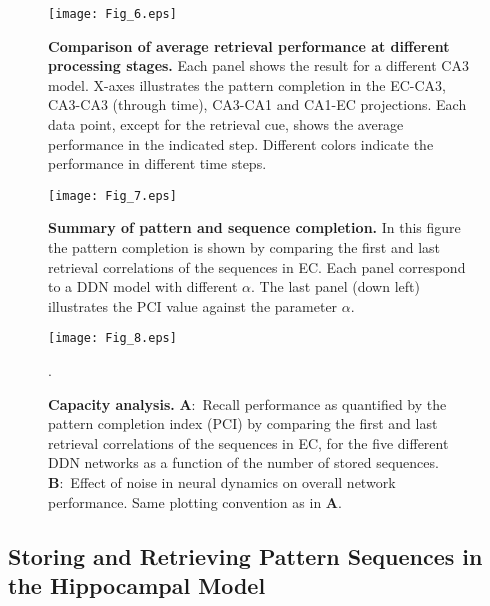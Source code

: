 \documentclass[utf8]{frontiersSCNS} %
\begin{document}
\begin{figure}[!htb]
\centering\texttt{[image: Fig\_6.eps]}
\caption{\textbf{Comparison of average retrieval performance at different processing stages.}
Each panel shows the result for a different CA3 model. X-axes illustrates the pattern completion in the EC-CA3, CA3-CA3 (through time), CA3-CA1 and CA1-EC projections. Each data point, except for the retrieval cue, shows the average performance in the indicated step. Different colors indicate the performance in different time steps.}
\label{Fig_6}
\end{figure}

\begin{figure}[!htb]
\centering\texttt{[image: Fig\_7.eps]}
\caption{\textbf{Summary of pattern and sequence completion.} In this figure the pattern completion is shown by comparing the first and last retrieval correlations of the sequences in EC. Each panel correspond to a  DDN model with different $\alpha$. The last panel (down left) illustrates the PCI value against the parameter $\alpha$.}
\label{Fig_7}
\end{figure}


\begin{figure}[!htb]
\centering\texttt{[image: Fig\_8.eps]}
\caption{\textbf{Capacity analysis.} 
\textbf{A}:~Recall performance as quantified by the pattern completion index (PCI) by comparing the first and last retrieval correlations of the sequences in EC, for the five different DDN networks as a function of the number of stored sequences. 
\textbf{B}:~Effect of noise in neural dynamics on overall network performance.
Same plotting convention as in \textbf{A}.
}.   
\label{Fig_8}
\end{figure}


\subsection{Storing and Retrieving Pattern Sequences in the Hippocampal Model}
\end{document}
